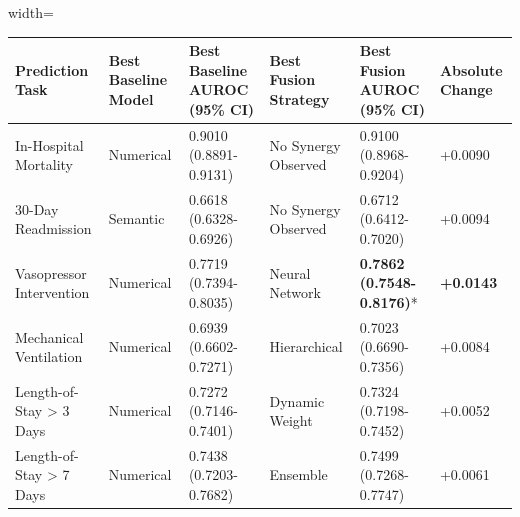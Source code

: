 \documentclass[border=0pt]{standalone}
\begin{document}
\begin{adjustbox}{width=\textwidth}
\begin{tabular}{llllll}
\toprule
Prediction Task & Best Baseline Model & Best Baseline AUROC (95\% CI) & Best Fusion Strategy & Best Fusion AUROC (95\% CI) & Absolute Change \\
\midrule
In-Hospital Mortality & Numerical & 0.9010 (0.8891-0.9131) & No Synergy Observed & 0.9100 (0.8968-0.9204) & +0.0090 \\
30-Day Readmission & Semantic & 0.6618 (0.6328-0.6926) & No Synergy Observed & 0.6712 (0.6412-0.7020) & +0.0094 \\
Vasopressor Intervention & Numerical & 0.7719 (0.7394-0.8035) & Neural Network & \textbf{0.7862 (0.7548-0.8176)}* & \textbf{+0.0143} \\
Mechanical Ventilation & Numerical & 0.6939 (0.6602-0.7271) & Hierarchical & 0.7023 (0.6690-0.7356) & +0.0084 \\
Length-of-Stay \textgreater{} 3 Days & Numerical & 0.7272 (0.7146-0.7401) & Dynamic Weight & 0.7324 (0.7198-0.7452) & +0.0052 \\
Length-of-Stay \textgreater{} 7 Days & Numerical & 0.7438 (0.7203-0.7682) & Ensemble & 0.7499 (0.7268-0.7747) & +0.0061 \\
\bottomrule
\end{tabular}
\end{adjustbox}
\end{document}
